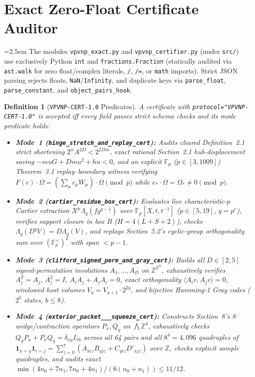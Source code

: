 \documentclass[10pt,twocolumn]{article}
\newtheorem{definition}{Definition}
\newcommand{\ZZ}{\mathbb{Z}}
\newcommand{\FF}{\mathbb{F}}
\begin{document}
\section{Exact Zero-Float Certificate Auditor}\label{sec:certifier}
{\emergencystretch=2.5em
The modules \texttt{vpvnp\_\allowbreak exact.py} and \texttt{vpvnp\_\allowbreak certifier.py} (under \texttt{src/}) use exclusively Python \texttt{int} and \texttt{fractions.\allowbreak Fraction} (statically audited via \texttt{ast.walk} for zero float/complex literals, \texttt{/}, \texttt{/=}, or \texttt{math} imports). Strict JSON parsing rejects floats, \texttt{NaN}/\texttt{Infinity}, and duplicate keys via \texttt{parse\_\allowbreak float}, \texttt{parse\_\allowbreak constant}, and \texttt{object\_\allowbreak pairs\_\allowbreak hook}.

\begin{definition}[\texttt{VPVNP-CERT-1.0} Predicates]\label{def:cert}
\normalfont A certificate with \texttt{protocol="VPVNP-CERT-1.0"} is accepted iff every field passes strict schema checks and its mode predicate holds:
\begin{itemize}[leftmargin=1.2em,itemsep=1pt,topsep=2pt]
  \item \textbf{Mode~1 (\texttt{hinge\_\allowbreak stretch\_\allowbreak and\_\allowbreak replay\_\allowbreak cert}):} Audits cleared Definition~2.1 strict shortening $2^w A^{2D} < 2^{2Dm}$, exact rational Section~2.1 hub-displacement saving $-muG+Dmu^2+hu < 0$, and an explicit $\FF_p$ ($p\in[3,1009]$) Theorem~3.1 replay--boundary witness verifying $F(c)\cdot\Omega=(\sum_\mu c_\mu W_\mu)\cdot\Omega\pmod p$ while $e_*\cdot\Omega=\Omega_*\ne 0\pmod p$.
  \item \textbf{Mode~2 (\texttt{cartier\_\allowbreak residue\_\allowbreak box\_\allowbreak cert}):} Evaluates live characteristic-$p$ Cartier extraction $X^\mu\Lambda_q(f g^{q-1})$ over $\FF_p[X,t,t^{-1}]$ ($p\in[5,19]$, $q=p^r$), verifies support closure in box $B$ ($H=4(L+S+2)$), checks $\Lambda_q(D^q V)=D\Lambda_q(V)$, and replays Section~5.2's cyclic-group orthogonality sum over $(\FF_p^\times)^2$ with span $<p-1$.
  \item \textbf{Mode~3 (\texttt{clifford\_\allowbreak signed\_\allowbreak perm\_\allowbreak and\_\allowbreak gray\_\allowbreak cert}):} Builds all $D\in[2,5]$ signed-permutation involutions $A_1,\dots,A_D$ on $\ZZ^{2^D}$, exhaustively verifies $A_j^T=A_j$, $A_j^2=I$, $A_i A_j+A_j A_i=0$, exact orthogonality $\langle A_i v, A_j v\rangle=0$, windowed host volumes $V_a = V_{a+1}\cdot 2^{2q}$, and bijective Hamming-1 Gray codes ($2^b$ states, $b\le 8$).
  \item \textbf{Mode~4 (\texttt{exterior\_\allowbreak packet\_\_\_\allowbreak squeeze\_\allowbreak cert}):} Constructs Section~8's 8 wedge/contraction operators $P_x,Q_y$ on $\bigwedge\ZZ^4$, exhaustively checks $Q_y P_x+P_x Q_y=\delta_{xy}I_{16}$ across all 64 pairs and all $8^4=4{,}096$ quadruples of $\mathbf{1}_{x=y}\mathbf{1}_{i=j}=\sum_{z=0}^7(A_{xiz}B_{yjz}+C_{yiz}D'_{xjz})$ over $\ZZ$, checks explicit sample quadruples, and audits exact $\min(4n_0+7n_1,7n_0+4n_1)/(6(n_0+n_1))\le 11/12$.
\end{itemize}
\end{definition}}
\end{document}
